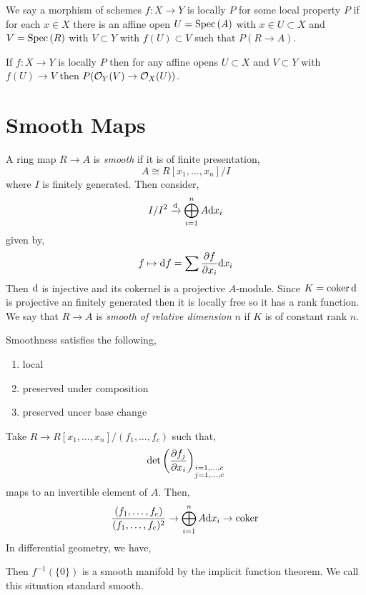 \documentclass[12pt]{article}
\begin{document}
\begin{defn}
We say a morphism of schemes $f : X \to Y$ is locally $P$ for some local property $P$ if for each $x \in X$ there is an affine open $U = \mathrm{Spec}\left( A \right)$ with $x \in U \subset X$ and $V = \mathrm{Spec}\left( R \right)$ with $V \subset Y$ with $f(U) \subset V$ such that $P(R \to A)$. 
\end{defn}

\begin{lemma}
If $f : X \to Y$ is locally $P$ then for any affine opens $U \subset X$ and $V \subset Y$ with $f(U) \to V$ then $P(\mathcal{O}_{Y}(V) \to \mathcal{O}_{X}(U))$. 
\end{lemma}

\begin{rmk}

\end{rmk}

\section{Smooth Maps}

\begin{defn}
A ring map $R \to A$ is \textit{smooth} if it is of finite presentation,
\[ A \cong R[x_1, \dots, x_n]/I \]
where $I$ is finitely generated. Then consider,
\[ I / I^2 \xrightarrow{\mathrm{d}} \bigoplus_{i = 1}^n A \mathrm{d}{x_i}  \]
given by,
\[ f \mapsto \mathrm{d}{f} = \sum \frac{\partial{f}}{\partial{x_i}} \mathrm{d}{x_i} \]
Then $\mathrm{d}$ is injective and its cokernel is a projective $A$-module. Since $K = \operatorname{\mathrm{coker}}{\mathrm{d}}$ is projective an finitely generated then it is locally free so it has a rank function. We say that $R \to A$ is \textit{smooth of relative dimension} $n$ if $K$ is of constant rank $n$.
\end{defn}

\begin{rmk}
Smoothness satisfies the following,
\begin{enumerate}
\item local
\item preserved under composition
\item preserved uncer base change 
\end{enumerate}
\end{rmk}

\begin{example}
Take $R \to R[x_1, \dots, x_n] / (f_1, \dots, f_c)$ such that,
\[ \det{ \left( \frac{\partial{f_j}}{\partial{x_i}} \right)_{\substack{i = 1, \dots, c \\ j = 1, \dots, c} }} \]
maps to an invertible element of $A$. 
Then,
\[ \frac{(f_1, \dots, f_c)}{(f_1, \dots, f_c)^2} \to \bigoplus_{i = 1}^n A \mathrm{d}{x_i} \to \operatorname{\mathrm{coker}}{} \]
In differential geometry, we have,
\begin{center}
\end{center}
Then $f^{-1}(\{ 0 \})$ is a smooth manifold by the implicit function theorem. We call this situation standard smooth.
\end{example}
\end{document}
